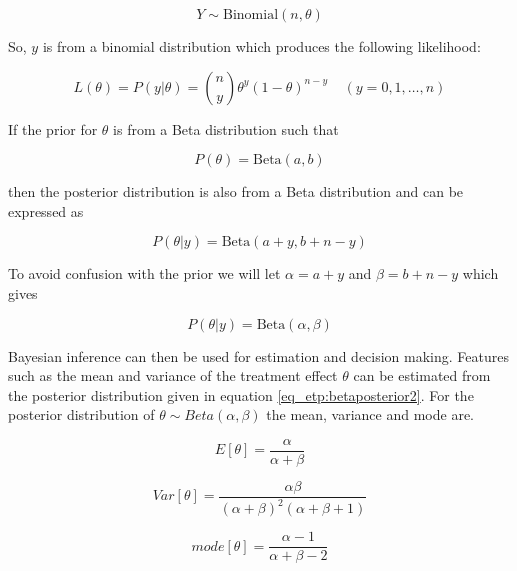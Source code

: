\begin{equation}
	Y \sim \text{Binomial}(n, \theta)
\end{equation}

So, $y$ is from a binomial distribution which produces the following likelihood: 

\begin{equation}
	L(\theta) = P(y|\theta) = {n \choose y}\theta^y (1-\theta)^{n-y} \; \; \; \; (y = 0,1,\ldots,n)
\end{equation}

If the prior for $\theta$ is from a Beta distribution such that 

\begin{equation}
	\label{eq_etp:betaprior}
	P(\theta) = \text{Beta}(a,b)
\end{equation}

then the posterior distribution is also from a Beta distribution and can be expressed as 

\begin{equation}
	\label{eq_etp:betaposterior}
	P(\theta|y) = \text{Beta}(a+y,b+n-y)
\end{equation}

To avoid confusion with the prior we will let $\alpha = a+y$ and $\beta = b+n-y$ which gives

\begin{equation}
	\label{eq_etp:betaposterior2}
	P(\theta|y) = \text{Beta}(\alpha,\beta)
\end{equation}

Bayesian inference can then be used for estimation and decision making. Features such as the mean and  variance of the treatment effect $\theta$ can be  estimated from the posterior distribution given in equation \ref{eq_etp:betaposterior2}. For the posterior distribution of $\theta \sim Beta(\alpha,\beta)$ the mean, variance and mode are.

\begin{equation}
	\label{eq_etp:betamean}
	E[\theta] = \frac{\alpha}{\alpha + \beta} 
\end{equation}

\begin{equation}
	\label{eq_etp:betavar}
	Var[\theta] = \frac{\alpha\beta}{(\alpha+\beta)^2 (\alpha+\beta+1)}
\end{equation}

\begin{equation}
	\label{eq_etp:betamode}
	mode[\theta] = \frac{\alpha - 1 }{\alpha + \beta - 2} 
\end{equation}

